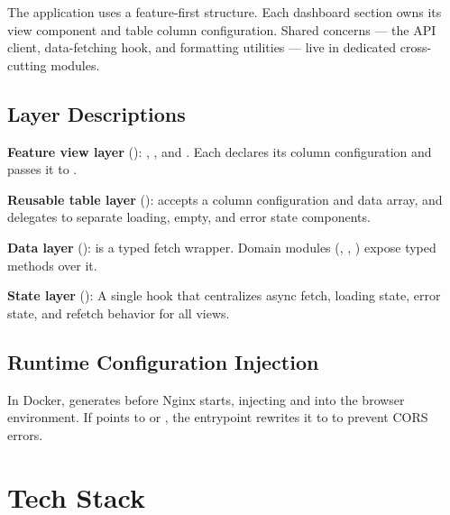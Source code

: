 The application uses a feature-first structure. Each dashboard section owns its view component and table column configuration. Shared concerns — the API client, data-fetching hook, and formatting utilities — live in dedicated cross-cutting modules.

\subsection{Layer Descriptions}

\textbf{Feature view layer} (): , , and . Each declares its column configuration and passes it to .

\textbf{Reusable table layer} ():  accepts a column configuration and data array, and delegates to separate loading, empty, and error state components.

\textbf{Data layer} ():  is a typed fetch wrapper. Domain modules (, , ) expose typed methods over it.

\textbf{State layer} (): A single hook that centralizes async fetch, loading state, error state, and refetch behavior for all views.

\subsection{Runtime Configuration Injection}

In Docker,  generates  before Nginx starts, injecting  and  into the browser environment. If  points to  or , the entrypoint rewrites it to  to prevent CORS errors.

\section{Tech Stack}

